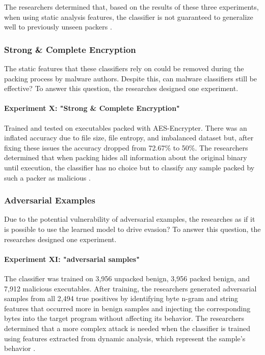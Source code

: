 \documentclass[sigconf]{acmart}
\begin{document}
The researchers determined that, based on the results of these three experiments, when using static analysis features, the classifier is not guaranteed to generalize well to previously unseen packers \cite{Aghakhani2020}.

\subsubsection{Strong \& Complete Encryption}
The static features that these classifiers rely on could be removed during the packing process by malware authors. Despite this, can malware classifiers still be effective? To answer this question, the researches designed one experiment.
\paragraph{Experiment X: "Strong \& Complete Encryption"}
Trained and tested on executables packed with AES-Encrypter. There was an inflated accuracy due to file size, file entropy, and imbalanced dataset but, after fixing these issues the accuracy dropped from 72.67\% to 50\%.
The researchers determined that when packing hides all information about the original binary until execution, the classifier has no choice but to classify any sample packed by such a packer as malicious \cite{Aghakhani2020}.
\subsubsection{Adversarial Examples}
Due to the potential vulnerability of adversarial examples, the researches as if it is possible to use the learned model to drive evasion? To answer this question, the researches designed one experiment.
\paragraph{Experiment XI: "adversarial samples"}
The classifier was trained on 3,956 unpacked benign, 3,956 packed benign, and 7,912 malicious executables.
After training, the researchers generated adversarial samples from all 2,494 true positives by identifying byte n-gram and string features that occurred more in benign samples and injecting the corresponding bytes into the target program without affecting its behavior.
The researchers determined that a more complex attack is needed when the classifier is trained using features extracted from dynamic analysis, which represent the sample's behavior \cite{Aghakhani2020}.
\end{document}
